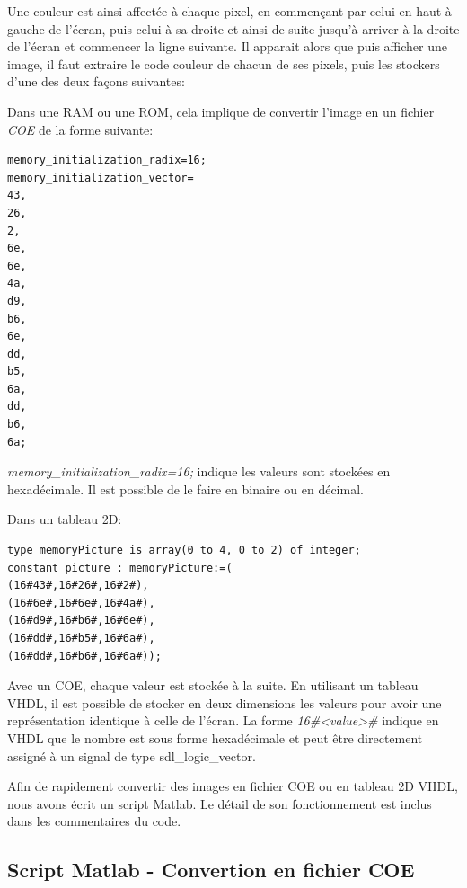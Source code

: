 \documentclass[french]{nakrule}
\begin{document}
Une couleur est ainsi affectée à chaque pixel, en commençant par celui en haut à
gauche de l'écran, puis celui à sa droite et ainsi de suite jusqu'à arriver à la
droite de l'écran et commencer la ligne suivante. Il apparait alors que puis
afficher une image, il faut extraire le code couleur de chacun de ses pixels,
puis les stockers d'une des deux façons suivantes:\vspace{.1in}
\begin{items}
\item Dans une RAM ou une ROM, cela implique de convertir l'image en un fichier
  \emph{COE} de la forme suivante:
  \begin{lstlisting}[frame=single, basicstyle=\scriptsize, backgroundcolor=\color{backcolor}]
memory_initialization_radix=16;
memory_initialization_vector=
43,
26,
2,
6e,
6e,
4a,
d9,
b6,
6e,
dd,
b5,
6a,
dd,
b6,
6a;
\end{lstlisting}
\emph{memory\_initialization\_radix=16;} indique les valeurs sont stockées en
hexadécimale. Il est possible de le faire en binaire ou en décimal.
\item Dans un tableau 2D:
  \begin{lstlisting}[style=vhdl]
type memoryPicture is array(0 to 4, 0 to 2) of integer;
constant picture : memoryPicture:=(
(16#43#,16#26#,16#2#),
(16#6e#,16#6e#,16#4a#),
(16#d9#,16#b6#,16#6e#),
(16#dd#,16#b5#,16#6a#),
(16#dd#,16#b6#,16#6a#));
  \end{lstlisting}
\end{items}

Avec un COE, chaque valeur est stockée à la suite. En utilisant un tableau VHDL,
il est possible de stocker en deux dimensions les valeurs pour avoir une
représentation identique à celle de l'écran. La forme \emph{16\#<value>\#} indique
en VHDL que le nombre est sous forme hexadécimale et peut être directement
assigné à un signal de type sdl\_logic\_vector.

Afin de rapidement convertir des images en fichier COE ou en tableau 2D VHDL,
nous avons écrit un script Matlab. Le détail de son fonctionnement est inclus
dans les commentaires du code.


\clearpage

\subsection{Script Matlab - Convertion en fichier COE}
\label{subsec:Script1}
\vspace{.1in}

\clearpage
\end{document}
